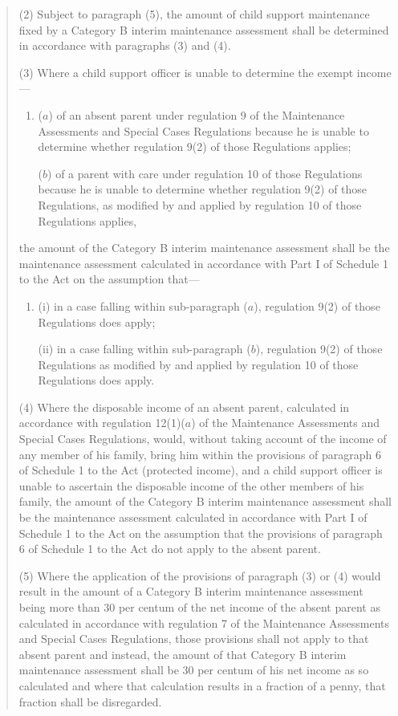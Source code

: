 \documentclass[a4paper]{article}
\begin{document}
\begin{quotation}
(2) Subject to paragraph (5), the amount of child support maintenance fixed by a Category B interim maintenance assessment shall be determined in accordance with paragraphs (3) and (4).

(3) Where a child support officer is unable to determine the exempt income—
\begin{enumerate}\item[]
($a$) of an absent parent under regulation 9 of the Maintenance Assessments and Special Cases Regulations because he is unable to determine whether regulation 9(2) of those Regulations applies;

($b$) of a parent with care under regulation 10 of those Regulations because he is unable to determine whether regulation 9(2) of those Regulations, as modified by and applied by regulation 10 of those Regulations applies,
\end{enumerate}
the amount of the Category B interim maintenance assessment shall be the maintenance assessment calculated in accordance with Part I of Schedule 1 to the Act on the assumption that—
\begin{enumerate}\item[]
(i) in a case falling within sub-paragraph ($a$), regulation 9(2) of those Regulations does apply;

(ii) in a case falling within sub-paragraph ($b$), regulation 9(2) of those Regulations as modified by and applied by regulation 10 of those Regulations does apply.
\end{enumerate}

(4) Where the disposable income of an absent parent, calculated in accordance with regulation 12(1)($a$) of the Maintenance Assessments and Special Cases Regulations, would, without taking account of the income of any member of his family, bring him within the provisions of paragraph 6 of Schedule 1 to the Act (protected income), and a child support officer is unable to ascertain the disposable income of the other members of his family, the amount of the Category B interim maintenance assessment shall be the maintenance assessment calculated in accordance with Part I of Schedule 1 to the Act on the assumption that the provisions of paragraph 6 of Schedule 1 to the Act do not apply to the absent parent.

(5) Where the application of the provisions of paragraph (3) or (4) would result in the amount of a Category B interim maintenance assessment being more than 30 per centum of the net income of the absent parent as calculated in accordance with regulation 7 of the Maintenance Assessments and Special Cases Regulations, those provisions shall not apply to that absent parent and instead, the amount of that Category B interim maintenance assessment shall be 30 per centum of his net income as so calculated and where that calculation results in a fraction of a penny, that fraction shall be disregarded.


\end{quotation}
\end{document}
